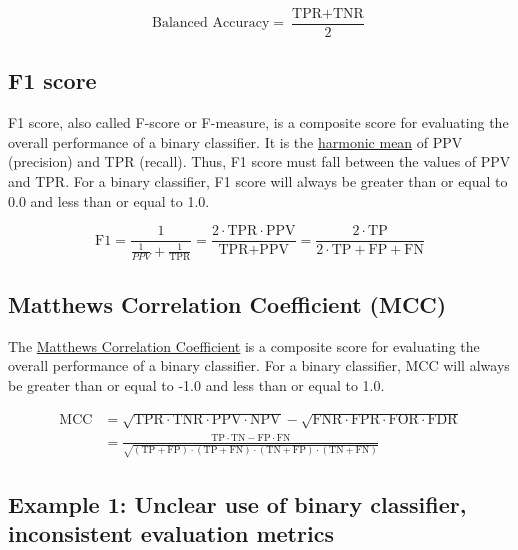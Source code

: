 \documentclass[letterpaper, 12pt]{article}
\begin{document}
$$\textrm{Balanced Accuracy} = \frac{\textrm{TPR} + \textrm{TNR}}{2}$$

\subsection*{F1 score}

F1 score, also called F-score or F-measure, is a composite score for evaluating the overall performance of a binary classifier. It is the \href{https://en.wikipedia.org/wiki/Harmonic_mean}{harmonic mean} of PPV (precision) and TPR (recall). Thus, F1 score must fall between the values of PPV and TPR. For a binary classifier, F1 score will always be greater than or equal to 0.0 and less than or equal to 1.0.

$$\textrm{F1} = \frac{1}{\frac{1}{PPV} + \frac{1}{\textrm{TPR}}} = \frac{2 \cdot \textrm{TPR} \cdot \textrm{PPV}}{\textrm{TPR} + \textrm{PPV}} = \frac{2 \cdot \textrm{TP}}{2 \cdot \textrm{TP} + \textrm{FP} + \textrm{FN}}$$

\subsection*{Matthews Correlation Coefficient (MCC)}

The \href{https://en.wikipedia.org/wiki/Phi_coefficient}{Matthews Correlation Coefficient} is a composite score for evaluating the overall performance of a binary classifier. For a binary classifier, MCC will always be greater than or equal to -1.0 and less than or equal to 1.0.

\begin{align*} 
\textrm{MCC} &= \sqrt{\textrm{TPR} \cdot \textrm{TNR} \cdot \textrm{PPV} \cdot \textrm{NPV}} - \sqrt{\textrm{FNR} \cdot \textrm{FPR} \cdot \textrm{FOR} \cdot \textrm{FDR}}\\ 
 &= \frac{\textrm{TP}\cdot\textrm{TN}-\textrm{FP}\cdot\textrm{FN}}{\sqrt{ (\textrm{TP}+\textrm{FP})\cdot(\textrm{TP}+\textrm{FN})\cdot(\textrm{TN}+\textrm{FP})\cdot(\textrm{TN}+\textrm{FN}) }}\
\end{align*}

\pagebreak

\subsection*{Example 1: Unclear use of binary classifier, inconsistent evaluation metrics}
\end{document}
